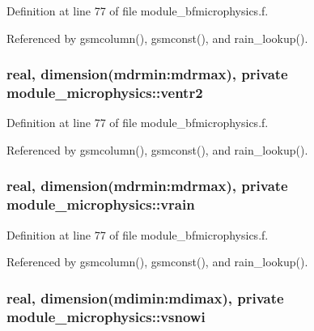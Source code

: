 Definition at line 77 of file module\+\_\+bfmicrophysics.\+f.



Referenced by gsmcolumn(), gsmconst(), and rain\+\_\+lookup().

\subsubsection[{\texorpdfstring{ventr2}{ventr2}}]{\setlength{\rightskip}{0pt plus 5cm}real, dimension(mdrmin\+:mdrmax), private module\+\_\+microphysics\+::ventr2\hspace{0.3cm}{\ttfamily [private]}}\hypertarget{namespacemodule__microphysics_a95936805512ce6f13a072461b3694020}{}\label{namespacemodule__microphysics_a95936805512ce6f13a072461b3694020}


Definition at line 77 of file module\+\_\+bfmicrophysics.\+f.



Referenced by gsmcolumn(), gsmconst(), and rain\+\_\+lookup().

\subsubsection[{\texorpdfstring{vrain}{vrain}}]{\setlength{\rightskip}{0pt plus 5cm}real, dimension(mdrmin\+:mdrmax), private module\+\_\+microphysics\+::vrain\hspace{0.3cm}{\ttfamily [private]}}\hypertarget{namespacemodule__microphysics_aa57b0e61801d417b3866f69269e886b2}{}\label{namespacemodule__microphysics_aa57b0e61801d417b3866f69269e886b2}


Definition at line 77 of file module\+\_\+bfmicrophysics.\+f.



Referenced by gsmcolumn(), gsmconst(), and rain\+\_\+lookup().

\subsubsection[{\texorpdfstring{vsnowi}{vsnowi}}]{\setlength{\rightskip}{0pt plus 5cm}real, dimension(mdimin\+:mdimax), private module\+\_\+microphysics\+::vsnowi\hspace{0.3cm}{\ttfamily [private]}}\hypertarget{namespacemodule__microphysics_acd06af071ee4f0a5bb4599f239916dd7}{}\label{namespacemodule__microphysics_acd06af071ee4f0a5bb4599f239916dd7}


